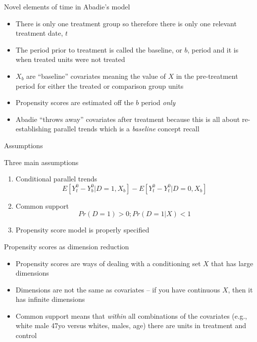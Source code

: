 \documentclass{beamer}
\begin{document}
\begin{frame}{Novel elements of time in Abadie's model}

\begin{itemize}
\item There is only one treatment group so therefore there is only one relevant treatment date, $t$
\item The period prior to treatment is called the baseline, or $b$, period and it is when treated units were not treated 
\item $X_b$ are ``baseline'' covariates meaning the value of $X$ in the pre-treatment period for either the treated or comparison group units
\item Propensity scores are estimated off the $b$ period \emph{only} 
\item Abadie ``throws away'' covariates after treatment because this is all about re-establishing parallel trends which is a \emph{baseline} concept recall
\end{itemize}

\end{frame}

\begin{frame}{Assumptions}

Three main assumptions

\begin{enumerate}
\item Conditional parallel trends $$E[Y^0_t - Y^0_b|D=1,X_b] - E[Y^0_t - Y^0_t | D=0, X_b]$$ 
\item Common support $$Pr(D=1)>0; Pr(D=1|X)<1$$ 
\item Propensity score model is properly specified 
\end{enumerate}

\end{frame}

\begin{frame}{Propensity scores as dimension reduction}

\begin{itemize}

\item Propensity scores are ways of dealing with a conditioning set $X$ that has large dimensions
\item Dimensions are not the same as covariates -- if you have continuous $X$, then it has infinite dimensions
\item Common support means that \emph{within} all combinations of the covariates (e.g., white male 47yo versus whites, males, age) there are units in treatment and control

\end{itemize}

\end{frame}
\end{document}
